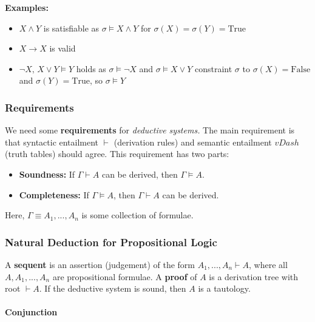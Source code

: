 \documentclass[a4paper]{extarticle}
\begin{document}
\begin{ebox}
    \textbf{Examples:}

    \begin{itemize}
        \item \(X \land Y\) is satisfiable as \(\sigma \vDash X \land Y\) for \(\sigma(X) = \sigma(Y) = \text{True}\)
        \item \(X \to X\) is valid
        \item \(\lnot  X, \, X \lor Y \vDash Y\) holds as \(\sigma \vDash \lnot X\) and \(\sigma \vDash X \lor Y\) constraint \(\sigma\) to \(\sigma(X) = \text{False}\) and \(\sigma(Y) = \text{True}\), so \(\sigma \vDash Y\)
    \end{itemize}
\end{ebox}

\subsubsection{Requirements}

We need some \textbf{requirements} for \textit{deductive systems.} The main requirement is that syntactic entailment \(\vdash\) (derivation rules) and semantic entailment \(vDash\) (truth tables) should agree. This requirement has two parts:

\begin{itemize}
    \item \textbf{Soundness:} If \(\Gamma \vdash A\) can be derived, then \(\Gamma \vDash A\).
    \item \textbf{Completeness:} If \(\Gamma \vDash A\), then \(\Gamma \vdash A\) can be derived.
\end{itemize}

Here, \(\Gamma \equiv A_1,...,A_n\) is some collection of formulae.

\subsubsection{Natural Deduction for Propositional Logic}

A \textbf{sequent} is an assertion (judgement) of the form \(A_1,...,A_n \vdash A\), where all \(A,A_1,...,A_n\) are propositional formulae. A \textbf{proof} of \(A\) is a derivation tree with root \(\vdash A\). If the deductive system is sound, then \(A\) is a tautology.

\paragraph{Conjunction}
\end{document}
